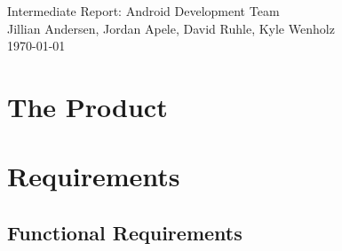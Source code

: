 \documentclass[12pt]{article}
\begin{document}
 \begin{titlepage}
    \vspace*{\fill}
    \begin{center}
      {\Huge Intermediate Report: Android Development Team}\\[0.5cm]
      {\Large Jillian Andersen, Jordan Apele, David Ruhle, Kyle Wenholz}\\[0.4cm]
      \today
    \end{center}
    \vspace*{\fill}
  \end{titlepage}

\tableofcontents
\newpage


\section{The Product}


\section{Requirements}
\subsection{Functional Requirements}
\end{document}
